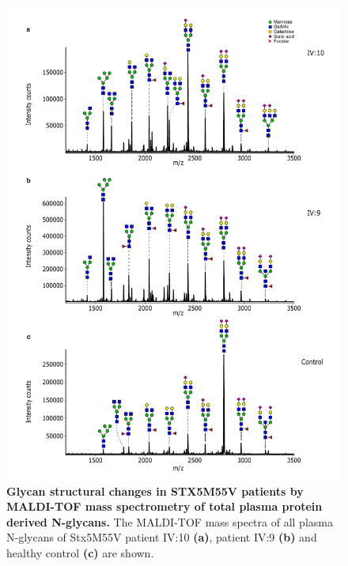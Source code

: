 \begin{figure}
    \includegraphics[keepaspectratio=true,scale=0.6]{chapters/chapter6/chapter6_SupplementaryFigure3.pdf}
    \caption{\textbf{Glycan structural changes in STX5M55V patients by MALDI-TOF mass spectrometry of total plasma protein derived N-glycans.} The MALDI-TOF mass spectra of all plasma N-glycans of Stx5M55V patient IV:10 \textbf{(a)}, patient IV:9 \textbf{(b)} and healthy control \textbf{(c)} are shown.}
    \label{fig:ch6supfig3}
\end{figure}

\clearpage

